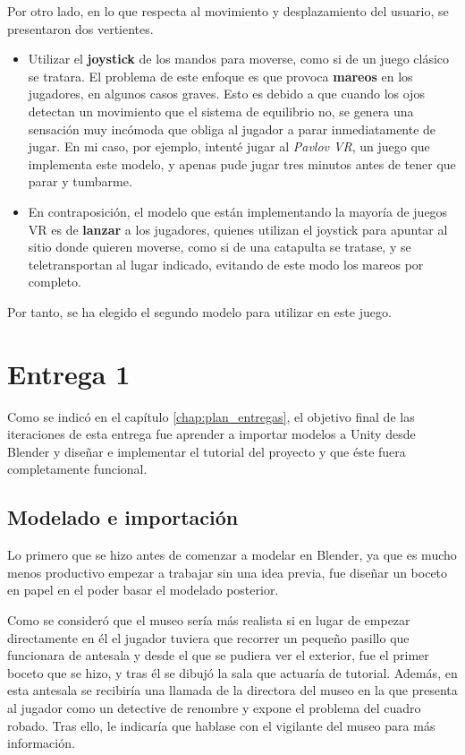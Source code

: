 Por otro lado, en lo que respecta al movimiento y desplazamiento del usuario, se presentaron dos vertientes.

\begin{itemize}
    \item Utilizar el \textbf{joystick} de los mandos para moverse, como si de un juego clásico se tratara. El problema de este enfoque es que provoca \textbf{mareos} en los jugadores, en algunos casos graves. Esto es debido a que cuando los ojos detectan un movimiento que el sistema de equilibrio no, se genera una sensación muy incómoda que obliga al jugador a parar inmediatamente de jugar. En mi caso, por ejemplo, intenté jugar al \textit{Pavlov VR}, un juego que implementa este modelo, y apenas pude jugar tres minutos antes de tener que parar y tumbarme.
    
    \item En contraposición, el modelo que están implementando la mayoría de juegos \acs{VR} es de \textbf{lanzar} a los jugadores, quienes utilizan el joystick para apuntar al sitio donde quieren moverse, como si de una catapulta se tratase, y se teletransportan al lugar indicado, evitando de este modo los mareos por completo.
\end{itemize}

Por tanto, se ha elegido el segundo modelo para utilizar en este juego.

\section{Entrega 1}

Como se indicó en el capítulo \ref{chap:plan_entregas}, el objetivo final de las iteraciones de esta entrega fue aprender a importar modelos a Unity desde Blender y diseñar e implementar el tutorial del proyecto y que éste fuera completamente funcional. 

\subsection{Modelado e importación}

Lo primero que se hizo antes de comenzar a modelar en Blender, ya que es mucho menos productivo empezar a trabajar sin una idea previa, fue diseñar un boceto en papel en el poder basar el modelado posterior.

Como se consideró que el museo sería más realista si en lugar de empezar directamente en él el jugador tuviera que recorrer un pequeño pasillo que funcionara de antesala y desde el que se pudiera ver el exterior, fue el primer boceto que se hizo, y tras él se dibujó la sala que actuaría de tutorial. Además, en esta antesala se recibiría una llamada de la directora del museo en la que presenta al jugador como un detective de renombre y expone el problema del cuadro robado. Tras ello, le indicaría que hablase con el vigilante del museo para más información.

